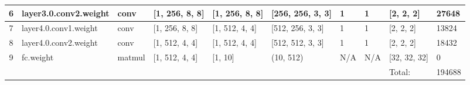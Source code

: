 \documentclass[sigconf]{acmart}
\begin{document}
\begin{table*}[]
\begin{tabular}{clllllll|l|l|}
\multicolumn{1}{|c|}{6}            & \multicolumn{1}{l|}{layer3.0.conv2.weight} & \multicolumn{1}{l|}{conv}   & \multicolumn{1}{l|}{{[}1, 256, 8, 8{]}}   & \multicolumn{1}{l|}{{[}1, 256, 8, 8{]}}   & \multicolumn{1}{l|}{{[}256, 256, 3, 3{]}} & \multicolumn{1}{l|}{1} & 1 & {[}2, 2, 2{]}    & 27648  \\ \hline
\multicolumn{1}{|c|}{7}            & \multicolumn{1}{l|}{layer4.0.conv1.weight} & \multicolumn{1}{l|}{conv}   & \multicolumn{1}{l|}{{[}1, 256, 8, 8{]}}   & \multicolumn{1}{l|}{{[}1, 512, 4, 4{]}}   & \multicolumn{1}{l|}{{[}512, 256, 3, 3{]}} & \multicolumn{1}{l|}{1} & 1 & {[}2, 2, 2{]}    & 13824  \\ \hline
\multicolumn{1}{|c|}{8}            & \multicolumn{1}{l|}{layer4.0.conv2.weight} & \multicolumn{1}{l|}{conv}   & \multicolumn{1}{l|}{{[}1, 512, 4, 4{]}}   & \multicolumn{1}{l|}{{[}1, 512, 4, 4{]}}   & \multicolumn{1}{l|}{{[}512, 512, 3, 3{]}} & \multicolumn{1}{l|}{1} & 1 & {[}2, 2, 2{]}    & 18432  \\ \hline
\multicolumn{1}{|c|}{9}            & \multicolumn{1}{l|}{fc.weight}             & \multicolumn{1}{l|}{matmul} & \multicolumn{1}{l|}{{[}1, 512, 4, 4{]}}   & \multicolumn{1}{l|}{{[}1, 10{]}}          & \multicolumn{1}{l|}{(10, 512)}            & \multicolumn{1}{l|}{N/A}        & N/A              & {[}32, 32, 32{]} & 0      \\ \hline
\multicolumn{1}{l}{}               &                                            &                             &                                           &                                           &                                           &                                 &                  & Total:           & 194688 \\ \cline{9-10} 
\end{tabular}
\label{tab:resnet9_perf}
\end{table*}
\fi

\end{document}
